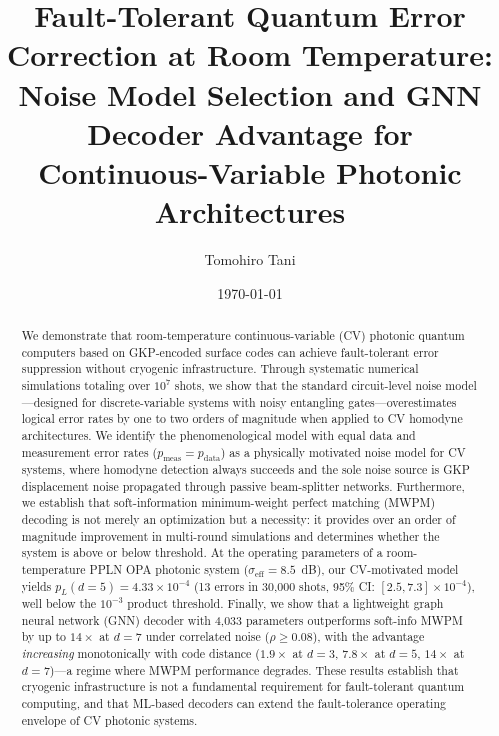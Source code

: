\documentclass[twocolumn,showpacs,preprintnumbers,amsmath,amssymb,superscriptaddress]{revtex4-2}
\begin{document}
\title{Fault-Tolerant Quantum Error Correction at Room Temperature:\\
Noise Model Selection and GNN Decoder Advantage for Continuous-Variable Photonic Architectures}

\author{Tomohiro Tani}

\date{\today}

\begin{abstract}
We demonstrate that room-temperature continuous-variable (CV) photonic quantum computers based on GKP-encoded surface codes can achieve fault-tolerant error suppression without cryogenic infrastructure. Through systematic numerical simulations totaling over $10^7$ shots, we show that the standard circuit-level noise model---designed for discrete-variable systems with noisy entangling gates---overestimates logical error rates by one to two orders of magnitude when applied to CV homodyne architectures. We identify the phenomenological model with equal data and measurement error rates ($p_{\mathrm{meas}} = p_{\mathrm{data}}$) as a physically motivated noise model for CV systems, where homodyne detection always succeeds and the sole noise source is GKP displacement noise propagated through passive beam-splitter networks. Furthermore, we establish that soft-information minimum-weight perfect matching (MWPM) decoding is not merely an optimization but a necessity: it provides over an order of magnitude improvement in multi-round simulations and determines whether the system is above or below threshold. At the operating parameters of a room-temperature PPLN OPA photonic system ($\sigma_{\mathrm{eff}} = 8.5$~dB), our CV-motivated model yields $p_L(d{=}5) = 4.33 \times 10^{-4}$ (13 errors in 30{,}000 shots, 95\% CI: $[2.5, 7.3] \times 10^{-4}$), well below the $10^{-3}$ product threshold. Finally, we show that a lightweight graph neural network (GNN) decoder with 4{,}033 parameters outperforms soft-info MWPM by up to $14\times$ at $d = 7$ under correlated noise ($\rho \geq 0.08$), with the advantage \emph{increasing} monotonically with code distance ($1.9\times$ at $d{=}3$, $7.8\times$ at $d{=}5$, $14\times$ at $d{=}7$)---a regime where MWPM performance degrades. These results establish that cryogenic infrastructure is not a fundamental requirement for fault-tolerant quantum computing, and that ML-based decoders can extend the fault-tolerance operating envelope of CV photonic systems.
\end{abstract}
\end{document}
